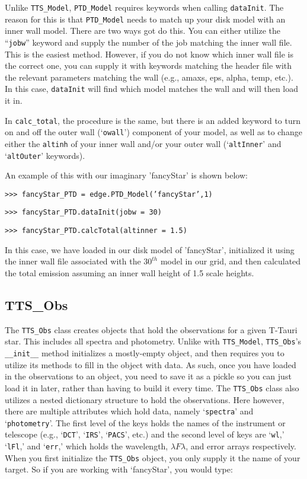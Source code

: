 \documentclass{article}
\begin{document}
Unlike \texttt{TTS\_Model}, \texttt{PTD\_Model} requires keywords when calling \texttt{dataInit}. The reason for this is that \texttt{PTD\_Model} needs to match up your disk model with an inner wall model. There are two ways got do this. You can either utilize the “\texttt{jobw}” keyword and supply the number of the job matching the inner wall file. This is the easiest method. However, if you do not know which inner wall file is the correct one, you can supply it with keywords matching the header file with the relevant parameters matching the wall (e.g., amaxs, eps, alpha, temp, etc.). In this case, \texttt{dataInit} will find which model matches the wall and will then load it in. 

 
In \texttt{calc\_total}, the procedure is the same, but there is an added keyword to turn on and off the outer wall (‘\texttt{owall}’) component of your model, as well as to change either the \texttt{altinh} of your inner wall and/or your outer wall (‘\texttt{altInner}’ and ‘\texttt{altOuter}’ keywords). 
 
 An example of this with our imaginary 'fancyStar' is shown below:

\vspace{2mm}
\texttt{>>> fancyStar\_PTD = edge.PTD\_Model('fancyStar',1)}

\texttt{>>> fancyStar\_PTD.dataInit(jobw = 30)}

\texttt{>>> fancyStar\_PTD.calcTotal(altinner = 1.5)}
\vspace{2mm}
 
In this case, we have loaded in our disk model of 'fancyStar', initialized it using the inner wall file associated with the $30^{th}$ model in our grid, and then calculated the total emission assuming an inner wall height of 1.5 scale heights. 
 
 
\subsection{TTS\_Obs}
 
The \texttt{TTS\_Obs} class creates objects that hold the observations for a given T-Tauri star. This includes all spectra and photometry. Unlike with \texttt{TTS\_Model}, \texttt{TTS\_Obs}’s \texttt{\_\_init\_\_} method initializes a mostly-empty object, and then requires you to utilize its methods to fill in the object with data. As such, once you have loaded in the observations to an object, you need to save it as a pickle so you can just load it in later, rather than having to build it every time. 
The \texttt{TTS\_Obs} class also utilizes a nested dictionary structure to hold the observations. Here however, there are multiple attributes which hold data, namely `\texttt{spectra}' and `\texttt{photometry}'. The first level of the keys holds the names of the instrument or telescope (e.g., ‘\texttt{DCT}’, ‘\texttt{IRS}’, ‘\texttt{PACS}’, etc.) and the second level of keys are ‘\texttt{wl},’ ‘\texttt{lFl},’ and ‘\texttt{err},’ which holds the wavelength, $\lambda F\lambda$, and error arrays respectively.  
When you first initialize the \texttt{TTS\_Obs} object, you only supply it the name of your target. So if you are working with `fancyStar', you would type: 
\end{document}
